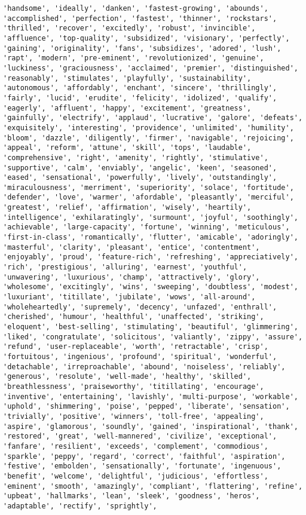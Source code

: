 \documentclass[11pt]{article}
\begin{document}
\begin{Verbatim}[commandchars=\\\{\}]
'handsome', 'ideally', 'danken', 'fastest-growing', 'abounds', 'accomplished', 'perfection', 'fastest', 'thinner', 'rockstars', 'thrilled', 'recover', 'excitedly', 'robust', 'invincible', 'affluence', 'top-quality', 'subsidized', 'visionary', 'perfectly', 'gaining', 'originality', 'fans', 'subsidizes', 'adored', 'lush', 'rapt', 'modern', 'pre-eminent', 'revolutionized', 'genuine', 'luckiness', 'graciousness', 'acclaimed', 'premier', 'distinguished', 'reasonably', 'stimulates', 'playfully', 'sustainability', 'autonomous', 'affordably', 'enchant', 'sincere', 'thrillingly', 'fairly', 'lucid', 'erudite', 'felicity', 'idolized', 'qualify', 'eagerly', 'affluent', 'happy', 'excitement', 'greatness', 'gainfully', 'electrify', 'applaud', 'lucrative', 'galore', 'defeats', 'exquisitely', 'interesting', 'providence', 'unlimited', 'humility', 'bloom', 'dazzle', 'diligently', 'firmer', 'navigable', 'rejoicing', 'appeal', 'reform', 'attune', 'skill', 'tops', 'laudable', 'comprehensive', 'right', 'amenity', 'rightly', 'stimulative', 'supportive', 'calm', 'enviably', 'angelic', 'keen', 'seasoned', 'eased', 'sensational', 'powerfully', 'lively', 'outstandingly', 'miraculousness', 'merriment', 'superiority', 'solace', 'fortitude', 'defender', 'love', 'warmer', 'afordable', 'pleasantly', 'merciful', 'greatest', 'relief', 'affirmation', 'wisely', 'heartily', 'intelligence', 'exhilaratingly', 'surmount', 'joyful', 'soothingly', 'achievable', 'large-capacity', 'fortune', 'winning', 'meticulous', 'first-in-class', 'romantically', 'flutter', 'amicable', 'adoringly', 'masterful', 'clarity', 'pleasant', 'entice', 'contentment', 'enjoyably', 'proud', 'feature-rich', 'refreshing', 'appreciatively', 'rich', 'prestigious', 'alluring', 'earnest', 'youthful', 'unwavering', 'luxurious', 'champ', 'attractively', 'glory', 'wholesome', 'excitingly', 'wins', 'sweeping', 'doubtless', 'modest', 'luxuriant', 'titillate', 'jubilate', 'wows', 'all-around', 'wholeheartedly', 'supremely', 'decency', 'unfazed', 'enthrall', 'cherished', 'humour', 'healthful', 'unaffected', 'striking', 'eloquent', 'best-selling', 'stimulating', 'beautiful', 'glimmering', 'liked', 'congratulate', 'solicitous', 'valiantly', 'zippy', 'assure', 'refund', 'user-replaceable', 'worth', 'retractable', 'crisp', 'fortuitous', 'ingenious', 'profound', 'spiritual', 'wonderful', 'detachable', 'irreproachable', 'abound', 'noiseless', 'reliably', 'generous', 'resolute', 'well-made', 'healthy', 'skilled', 'breathlessness', 'praiseworthy', 'titillating', 'encourage', 'inventive', 'entertaining', 'lavishly', 'multi-purpose', 'workable', 'uphold', 'shimmering', 'poise', 'pepped', 'liberate', 'sensation', 'trivially', 'positive', 'winners', 'toll-free', 'appealing', 'aspire', 'glamorous', 'soundly', 'gained', 'inspirational', 'thank', 'restored', 'great', 'well-mannered', 'civilize', 'exceptional', 'fanfare', 'resilient', 'exceeds', 'complement', 'commodious', 'sparkle', 'peppy', 'regard', 'correct', 'faithful', 'aspiration', 'festive', 'embolden', 'sensationally', 'fortunate', 'ingenuous', 'benefit', 'welcome', 'delightful', 'judicious', 'effortless', 'eminent', 'smooth', 'amazingly', 'compliant', 'flattering', 'refine', 'upbeat', 'hallmarks', 'lean', 'sleek', 'goodness', 'heros', 'adaptable', 'rectify', 'sprightly', 
\end{Verbatim}
\end{document}

